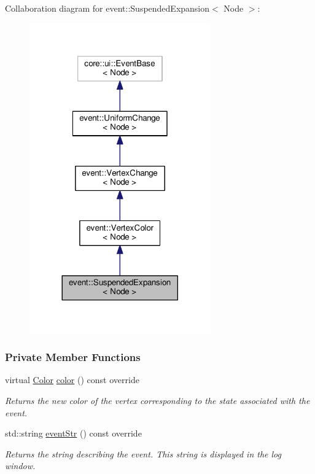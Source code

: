 Collaboration diagram for event\+:\+:Suspended\+Expansion$<$ Node $>$\+:\nopagebreak
\begin{figure}[H]
\begin{center}
\leavevmode
\includegraphics[width=221pt]{structevent_1_1SuspendedExpansion__coll__graph}
\end{center}
\end{figure}
\subsubsection*{Private Member Functions}
\begin{DoxyCompactItemize}
\item 
virtual \hyperlink{colors_8h_ab87bacfdad76e61b9412d7124be44c1c}{Color} \hyperlink{structevent_1_1SuspendedExpansion_a894dc487c1c147092c4c4313588becbb}{color} () const override
\begin{DoxyCompactList}\small\item\em Returns the new color of the vertex corresponding to the state associated with the event. \end{DoxyCompactList}\item 
std\+::string \hyperlink{structevent_1_1SuspendedExpansion_a8f1a40cb301ea53ce2ab575b1db6ce45}{event\+Str} () const override
\begin{DoxyCompactList}\small\item\em Returns the string describing the event. This string is displayed in the log window. \end{DoxyCompactList}\end{DoxyCompactItemize}
